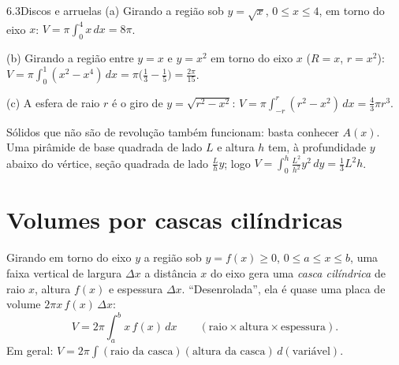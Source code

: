 \begin{exemplo}{6.3}{Discos e arruelas}
(a) Girando a região sob $y=\sqrt x$, $0\le x\le4$, em torno do eixo $x$:
$V=\pi\int_0^4x\,dx=8\pi$.

(b) Girando a região entre $y=x$ e $y=x^2$ em torno do eixo $x$ ($R=x$, $r=x^2$):
$V=\pi\int_0^1(x^2-x^4)\,dx=\pi\big(\tfrac13-\tfrac15\big)=\tfrac{2\pi}{15}$.

(c) A esfera de raio $r$ é o giro de $y=\sqrt{r^2-x^2}$:
$V=\pi\int_{-r}^r(r^2-x^2)\,dx=\tfrac43\pi r^3$.
\end{exemplo}

Sólidos que não são de revolução também funcionam: basta conhecer $A(x)$. Uma pirâmide de
base quadrada de lado $L$ e altura $h$ tem, à profundidade $y$ abaixo do vértice, seção
quadrada de lado $\frac{L}{h}y$; logo $V=\int_0^h\frac{L^2}{h^2}y^2\,dy=\frac13L^2h$.

\section{Volumes por cascas cilíndricas}

Girando em torno do eixo $y$ a região sob $y=f(x)\ge0$, $0\le a\le x\le b$, uma faixa
vertical de largura $\Delta x$ a distância $x$ do eixo gera uma \emph{casca cilíndrica} de
raio $x$, altura $f(x)$ e espessura $\Delta x$. ``Desenrolada'', ela é quase uma placa de
volume $2\pi x\,f(x)\,\Delta x$:
\[
V=2\pi\int_a^b x\,f(x)\,dx \qquad(\text{raio}\times\text{altura}\times\text{espessura}).
\]
Em geral: $V=2\pi\int(\text{raio da casca})(\text{altura da casca})\,d(\text{variável})$.


